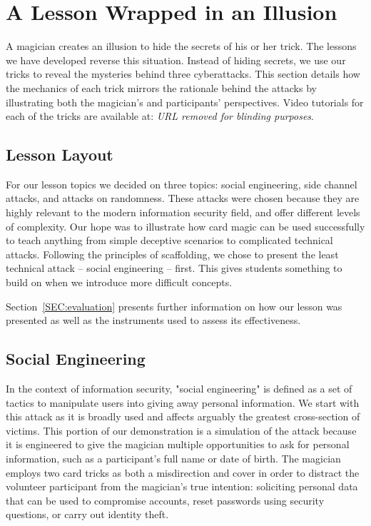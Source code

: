 \section{A Lesson Wrapped in an Illusion}
\label{SEC:background}


A magician creates an illusion to hide the secrets of his or her trick.
The lessons we have developed reverse this situation.
Instead of hiding secrets, we use our tricks to reveal
the mysteries behind
three cyberattacks.
This section details how the mechanics of each trick mirrors the
rationale behind the attacks by illustrating both the magician's and
participants' perspectives.  Video tutorials for each of the tricks are
available at: \textit{URL removed for blinding purposes}.


\subsection{Lesson Layout}

For our lesson topics we decided on three topics: social engineering, side
channel attacks, and attacks on randomness.
These attacks were chosen
because they
are highly relevant to the modern information security field,
and offer different levels of complexity.
Our hope was to illustrate how card magic can be used
successfully to teach anything from simple deceptive scenarios to complicated
technical attacks.
Following the principles of scaffolding,
we chose to present the least technical attack -- social engineering --
first.  This gives students something to build on when we introduce more
difficult concepts.

Section~\ref{SEC:evaluation} presents further information on how our lesson
was presented as well as the instruments used to assess its effectiveness.

\subsection{Social Engineering}

In the context of information security,
"social engineering" is defined as a set
of tactics to manipulate users into giving away personal information.
We start with this attack as it is broadly used and affects arguably the
greatest cross-section of victims.  This portion of our demonstration
is a simulation of the attack because it is engineered to give
the magician multiple opportunities to ask for personal information,
such as a participant's full name or date of birth.
The magician employs two card tricks
as
both a misdirection and cover
in order to
distract the
volunteer participant from
the magician's true intention: soliciting
personal data that
can be used to compromise accounts,
reset passwords using security questions, or
carry out identity theft.

